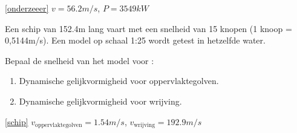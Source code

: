 \begin{antwoord}{\ref{onderzeeer}}
	$v = 56.2\unit{m/s}$, $P = 3549\unit{kW}$
\end{antwoord}
\begin{toepassing}[*]
	\label{schip}
Een schip van 152.4\unit{m} lang vaart met een snelheid van 15 knopen (1 knoop = 0,5144m/s). Een model op schaal 1:25 wordt getest in hetzelfde water.

Bepaal de snelheid van het model voor :
	\begin{enumerate}
		\item Dynamische gelijkvormigheid voor oppervlaktegolven.
		\item Dynamische gelijkvormigheid voor wrijving.
	\end{enumerate}
\end{toepassing}
\begin{antwoord}{\ref{schip}}
	$v_{\text{oppervlaktegolven}} = 1.54\unit{m/s}$, $v_{\text{wrijving}} = 192.9\unit{m/s}$
\end{antwoord}
